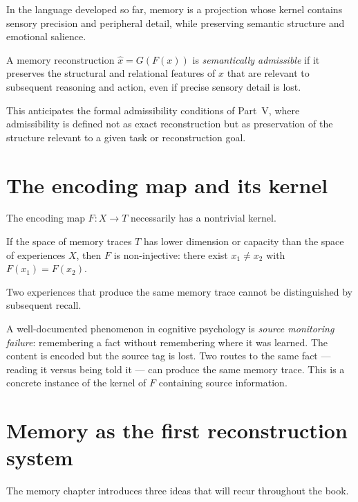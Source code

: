 In the language developed so far, memory is a projection whose
kernel contains sensory precision and peripheral detail, while
preserving semantic structure and emotional salience.

\begin{definition}
  A memory reconstruction $\hat{x} = G(F(x))$ is
  \emph{semantically admissible} if it preserves the
  structural and relational features of $x$ that are relevant
  to subsequent reasoning and action, even if precise sensory
  detail is lost.
\end{definition}

This anticipates the formal admissibility conditions of Part~V,
where admissibility is defined not as exact reconstruction but
as preservation of the structure relevant to a given task or
reconstruction goal.

\section{The encoding map and its kernel}

The encoding map $F : X \to T$ necessarily has a nontrivial kernel.

\begin{proposition}
  If the space of memory traces $T$ has lower dimension or
  capacity than the space of experiences $X$, then $F$ is
  non-injective: there exist $x_1 \neq x_2$ with
  $F(x_1) = F(x_2)$.
\end{proposition}

Two experiences that produce the same memory trace cannot be
distinguished by subsequent recall.

\begin{example}
  A well-documented phenomenon in cognitive psychology is
  \emph{source monitoring failure}: remembering a fact without
  remembering where it was learned.
  The content is encoded but the source tag is lost.
  Two routes to the same fact --- reading it versus being told it
  --- can produce the same memory trace.
  This is a concrete instance of the kernel of $F$ containing
  source information.
\end{example}

\section{Memory as the first reconstruction system}

The memory chapter introduces three ideas that will recur
throughout the book.

